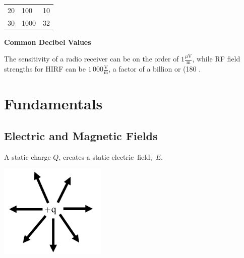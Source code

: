 \documentclass[
]{book}
\begin{document}
\begin{longtable}[]{@{}lll@{}}
\begin{minipage}[t]{0.11\columnwidth}\raggedright
20\strut
\end{minipage} & \begin{minipage}[t]{0.14\columnwidth}\raggedright
100\strut
\end{minipage} & \begin{minipage}[t]{0.15\columnwidth}\raggedright
10\strut
\end{minipage}\tabularnewline
\begin{minipage}[t]{0.11\columnwidth}\raggedright
30\strut
\end{minipage} & \begin{minipage}[t]{0.14\columnwidth}\raggedright
1000\strut
\end{minipage} & \begin{minipage}[t]{0.15\columnwidth}\raggedright
32\strut
\end{minipage}\tabularnewline
\bottomrule
\end{longtable}

\textbf{Common Decibel Values}

The sensitivity of a radio receiver can be on the order of
\(1 \frac{\mu \text{V}}{\text{m}}\), while RF field strengths for
HIRF can be \(1\,000 \frac{\text{V}}{\text{m}}\), a factor of a
billion or (180 .

\hypertarget{fundamentals-1}{%
\section{Fundamentals}\label{fundamentals-1}}

\hypertarget{electric-and-magnetic-fields}{%
\subsection{Electric and Magnetic Fields}\label{electric-and-magnetic-fields}}

A static charge \(Q\), creates a static electric~field,~\(E\).

\includegraphics[width=2in,height=\textheight]{media/14/charge-field.png}
\end{document}

